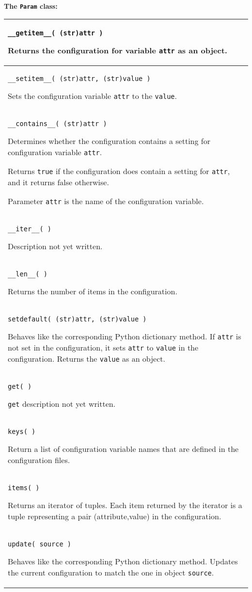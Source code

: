 \textbf{The \texttt{Param} class:}
\begin{flushleft}
\begin{tabular}{|p{16cm}|} \hline
\texttt{\_\_getitem\_\_( (str)attr )}

Returns the configuration for variable \texttt{attr}
as an object.
\\ \hline
\texttt{\_\_setitem\_\_( (str)attr, (str)value )}

Sets the configuration variable \texttt{attr} to the \texttt{value}.
\\ \hline
\texttt{\_\_contains\_\_( (str)attr )}

Determines whether the configuration contains a setting for 
configuration variable \texttt{attr}.

Returns \texttt{true} if the configuration does contain a
setting for \texttt{attr}, and it returns false otherwise.

Parameter \texttt{attr} is the name of the configuration variable.
\\ \hline
\texttt{\_\_iter\_\_( )}

Description not yet written.
\\ \hline
\texttt{\_\_len\_\_( )}

Returns the number of items in the configuration.
\\ \hline
\texttt{setdefault( (str)attr, (str)value )}

Behaves like the corresponding Python dictionary method.
If \texttt{attr} is not set in the configuration,
it sets \texttt{attr} to \texttt{value} in the configuration.
Returns the \texttt{value} as an object.
\\ \hline
\texttt{get( )}

\texttt{get} description
not yet written.
\\ \hline
\texttt{keys( )}

Return a list of configuration variable names that
are defined in the configuration files.
\\ \hline
\texttt{items( )}

Returns an iterator of tuples. 
Each item returned by the iterator is a tuple representing a pair 
(attribute,value) in the configuration.
\\ \hline
\texttt{update( source )}

Behaves like the corresponding Python dictionary method.
Updates the current configuration to match the one in object 
\texttt{source}.
\\ \hline

\end{tabular}
\end{flushleft}

